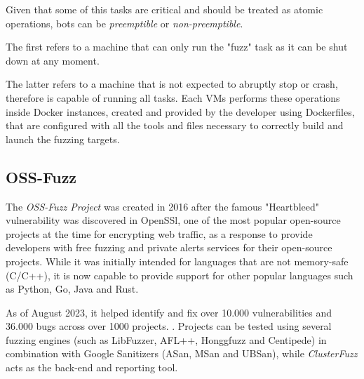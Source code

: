 
Given that some of this tasks are critical and should be treated as atomic operations, bots can be \textit{preemptible} or \textit{non-preemptible}.

The first refers to a machine that can only run the "fuzz" task as it can be shut down at any moment.

The latter refers to a machine that is not expected to abruptly stop or crash, therefore is capable of running all tasks.
Each VMs performs these operations inside Docker instances, created and provided by the developer using Dockerfiles, that are configured with all the tools and files necessary to correctly build and launch the fuzzing targets.


\subsection{OSS-Fuzz}



The \textit{OSS-Fuzz Project} \cite{ossfuzz_paper} was created in 2016 after the famous "Heartbleed" vulnerability was discovered in OpenSSl, one of the most popular open-source projects at the time for encrypting web traffic, as a response to provide developers with free fuzzing and private alerts services for their open-source projects.
While it was initially intended for languages that are not memory-safe (C/C++), it is now capable to provide support for other popular languages such as Python, Go, Java and Rust.  

As of August 2023, it helped identify and fix over 10.000 vulnerabilities and 36.000 bugs across over 1000 projects. \cite{ossfuzz_docs}.
Projects can be tested using several fuzzing engines (such as LibFuzzer, AFL++, Honggfuzz and Centipede) in combination with Google Sanitizers (ASan, MSan and UBSan), while \textit{ClusterFuzz} acts as the back-end and reporting tool.

